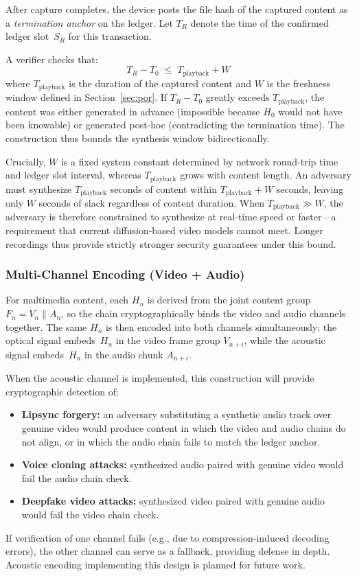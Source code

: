 \documentclass[11pt]{article}
\begin{document}
After capture completes, the device posts the file hash of the captured content as a
\emph{termination anchor} on the ledger. Let $T_R$ denote the time of the confirmed
ledger slot~$S_R$ for this transaction.

A verifier checks that:
\begin{equation}
  T_R - T_0 \;\leq\; T_{\text{playback}} + W
  \label{eq:timebound}
\end{equation}%
where $T_{\text{playback}}$ is the duration of the captured content and
$W$ is the freshness window defined in Section~\ref{sec:por}. If $T_R - T_0$ greatly exceeds $T_{\text{playback}}$, the
content was either generated in advance (impossible because $H_0$ would not have
been knowable) or generated post-hoc (contradicting the termination time). The
construction thus bounds the synthesis window bidirectionally.

Crucially, $W$ is a fixed system constant determined by network round-trip time
and ledger slot interval, whereas $T_{\text{playback}}$ grows with content length.
An adversary must synthesize $T_{\text{playback}}$ seconds of content within
$T_{\text{playback}} + W$ seconds, leaving only $W$ seconds of slack regardless
of content duration. When $T_{\text{playback}} \gg W$, the adversary is therefore
constrained to synthesize at real-time speed or faster---a requirement that
current diffusion-based video models cannot meet. Longer recordings thus
provide strictly stronger security guarantees under this bound.

\subsubsection{Multi-Channel Encoding (Video + Audio)}
\label{sec:dualchannel}

For multimedia content, each $H_n$ is derived from the joint content group
$F_n = V_n \| A_n$, so the chain cryptographically binds the video and audio
channels together. The same $H_n$ is then encoded into both channels simultaneously:
the optical signal embeds~$H_n$ in the video frame group $V_{n+i}$, while the
acoustic signal embeds~$H_n$ in the audio chunk $A_{n+i}$.

When the acoustic channel is implemented, this construction will provide
cryptographic detection of:
\begin{itemize}
  \item \textbf{Lipsync forgery:} an adversary substituting a synthetic audio track
    over genuine video would produce content in which the video and audio chains do
    not align, or in which the audio chain fails to match the ledger anchor.
  \item \textbf{Voice cloning attacks:} synthesized audio paired with genuine video
    would fail the audio chain check.
  \item \textbf{Deepfake video attacks:} synthesized video paired with genuine audio
    would fail the video chain check.
\end{itemize}
If verification of one channel fails (e.g., due to compression-induced decoding
errors), the other channel can serve as a fallback, providing defense in depth.
Acoustic encoding implementing this design is planned for future work.
\end{document}
